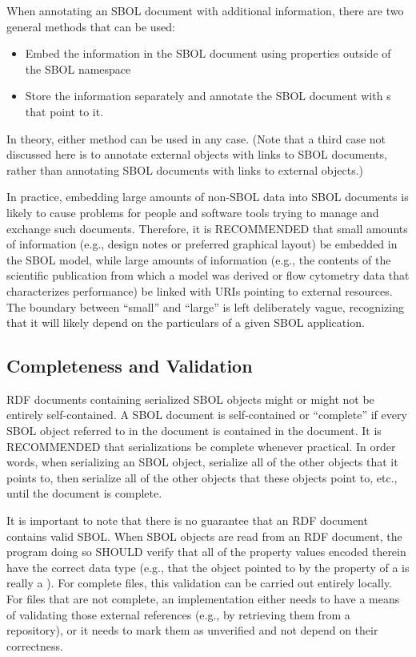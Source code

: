 When annotating an SBOL document with additional information, there are
two general methods that can be used:
\begin{itemize}
\item Embed the information in the SBOL document using properties outside of the SBOL namespace
\item Store the information separately and annotate the SBOL document with s that point to it.
\end{itemize}
In theory, either method can be used in any case. (Note that a third case not
discussed here is to annotate external objects with links
to SBOL documents, rather than annotating SBOL documents with links to external objects.)

In practice, 
embedding large amounts of non-SBOL data into SBOL documents is likely
to cause problems for people and software tools trying to manage and
exchange such documents.  Therefore, it is RECOMMENDED that small amounts of information (e.g., design notes or preferred graphical layout) be embedded in the SBOL model, while large amounts of information (e.g., the contents of the scientific publication from which a model was derived or flow cytometry data that characterizes performance) be linked with URIs pointing to external resources.  The boundary between ``small'' and ``large'' is left deliberately vague, recognizing that it will likely depend on the particulars of a given SBOL application.

\subsection{Completeness and Validation}

RDF documents containing serialized SBOL objects might or might not be
entirely self-contained.  A SBOL document is self-contained or ``complete'' if every SBOL object referred to in the document is contained in the document.  It is RECOMMENDED that serializations be complete whenever practical.  In order words, when serializing an SBOL object, serialize all of the other objects that it points to, then serialize all of the other objects that these objects point to, etc., until the document is complete.

It is important to note that there is no guarantee that an RDF document
contains valid SBOL. When SBOL objects are read from an RDF document,
 the program doing so SHOULD verify that all of the property
values encoded therein have the correct data type (e.g., that the object
pointed to by the  property of a
 is really a ).
For complete files, this validation can be carried out entirely locally. For files that are not complete, an implementation either needs to
have a means of validating those external references (e.g., by
retrieving them from a repository), or it needs to mark them as
unverified and not depend on their correctness.


